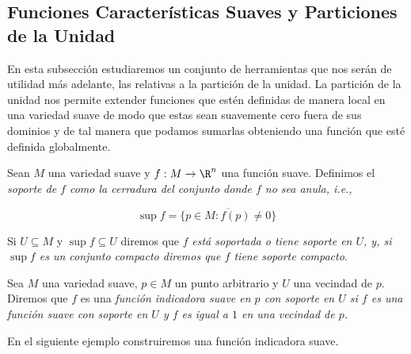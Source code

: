 \subsection{Funciones Características Suaves y Particiones de la Unidad} \label{Subsección: Funciones Características Suaves y Particiones De La Unidad}
En esta subsección estudiaremos un conjunto de herramientas que nos serán de utilidad más adelante, las relativas a la partición de la unidad. La partición de la unidad nos permite extender funciones que estén definidas de manera local en una variedad suave de modo que estas sean suavemente cero fuera de sus dominios y de tal manera que podamos sumarlas obteniendo una función que esté definida globalmente.

\begin{definition}\label{Definición: Soporte de una Función}
	Sean $M$ una variedad suave y $f: M \to \R^n$ una función suave. Definimos el \it{soporte de} $f$ como la cerradura del conjunto donde $f$ no sea anula, i.e.,

	\[ \sup f = \overline{ \{ p \in M : f(p) \neq 0 \}} \]

	Si $U \subseteq M$ y $\sup f \subseteq U$ diremos que $f$ \it{está soportada} o \it{tiene soporte en} $U$, y, si $\sup f$ es un conjunto compacto diremos que $f$ tiene \it{soporte compacto}.
\end{definition}

\begin{definition}\label{Definición: Función Indicadora Suave}
	Sea $M$ una variedad suave, $p \in M$ un punto arbitrario y $U$ una vecindad de $p$. Diremos que $f$ es una \it{función indicadora suave en $p$ con soporte en} $U$ si $f$ es una función suave con soporte en $U$ y $f$ es igual a $1$ en una vecindad de $p$.
\end{definition}


En el siguiente ejemplo construiremos una función indicadora suave.

